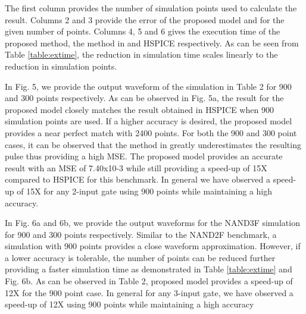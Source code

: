 The first column provides the number of simulation points used to calculate the result. Columns 2 and 3 provide the error of the proposed model and \cite{Accurate_Masking} for the given number of points. Columns 4, 5 and 6 gives the execution time of the proposed method, the method in \cite{Accurate_Masking} and HSPICE respectively. As can be seen from Table \ref{table:extime}, the reduction in simulation time scales linearly to the reduction in simulation points. 

In Fig. 5, we provide the output waveform of the simulation in Table 2 for 900 and 300 points respectively. As can be observed in Fig. 5a, the result for the proposed model closely matches the result obtained in HSPICE when 900 simulation points are used. If a higher accuracy is desired, the proposed model provides a near perfect match with 2400 points. For both the 900 and 300 point cases, it can be observed that the method in \cite{Accurate_Masking} greatly underestimates the resulting pulse thus providing a high MSE. The proposed model provides an accurate result with an MSE of 7.40x10-3 while still providing a speed-up of 15X compared to HSPICE for this benchmark. In general we have observed a speed-up of 15X for any 2-input gate using 900 points while maintaining a high accuracy.
  
In Fig. 6a and 6b, we provide the output waveforms for the NAND3F simulation for 900 and 300 points respectively. Similar to the NAND2F benchmark, a simulation with 900 points provides a close waveform approximation. However, if a lower accuracy is tolerable, the number of points can be reduced further providing a faster simulation time as demonstrated in Table \ref{table:extime} and Fig. 6b. As can be observed in Table 2, proposed model provides a speed-up of 12X for the 900 point case. In general for any 3-input gate, we have observed a speed-up of 12X using 900 points while maintaining a high accuracy

